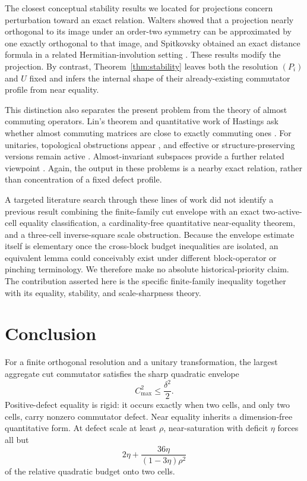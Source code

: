 \documentclass[11pt]{article}
\newcommand{\cmax}{C_{\max}}
\newcommand{\dd}{\delta}
\newcommand{\etaq}{\eta}
\begin{document}
The closest conceptual stability results we located for projections concern
perturbation toward an exact relation.  Walters showed that a projection
nearly orthogonal to its image under an order-two symmetry can be approximated
by one exactly orthogonal to that image, and Spitkovsky obtained an exact
distance formula in a related Hermitian-involution setting
\cite{Walters2017,Spitkovsky2018Distance}.  These results modify the
projection.  By contrast, Theorem~\ref{thm:stability} leaves both the
resolution $(P_i)$ and $U$ fixed and infers the internal shape of their
already-existing commutator profile from near equality.

This distinction also separates the present problem from the theory of
almost commuting operators.  Lin's theorem and quantitative work of Hastings
ask whether almost commuting matrices are close to exactly commuting ones
\cite{Lin1997AlmostCommuting,FriisRordam1996,Hastings2009}.  For unitaries,
topological obstructions appear
\cite{Voiculescu1983,ExelLoring1989,ExelLoring1991}, and effective or
structure-preserving versions remain active
\cite{DorOnHallKachkovskiy2025,Herrera2024,Herrera2026}.  Almost-invariant
subspaces provide a further related viewpoint
\cite{MarcouxPopovRadjavi2013}.  Again, the output in these problems is a
nearby exact relation, rather than concentration of a fixed defect profile.

A targeted literature search through these lines of work did not identify a
previous result combining the finite-family cut envelope with an exact
two-active-cell equality classification, a cardinality-free quantitative
near-equality theorem, and a three-cell inverse-square scale obstruction.
Because the envelope estimate itself is elementary once the cross-block
budget inequalities are isolated, an equivalent lemma could conceivably
exist under different block-operator or pinching terminology.  We therefore
make no absolute historical-priority claim.  The contribution asserted here
is the specific finite-family inequality together with its equality,
stability, and scale-sharpness theory.

\section{Conclusion}

For a finite orthogonal resolution and a unitary transformation, the
largest aggregate cut commutator satisfies the sharp quadratic envelope
\[
  \cmax^2\le\frac{\dd^2}{2}.
\]
Positive-defect equality is rigid: it occurs exactly when two cells, and only
two cells, carry nonzero commutator defect.  Near equality inherits a
dimension-free quantitative form.  At defect scale at least $\rho$,
near-saturation with deficit $\etaq$ forces all but
\[
  2\etaq+
  \frac{36\etaq}{(1-3\etaq)\rho^2}
\]
of the relative quadratic budget onto two cells.
\end{document}
